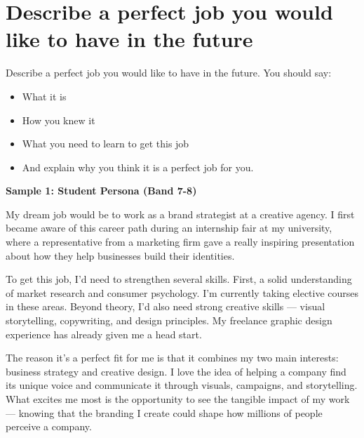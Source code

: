 \newpage

\section{Describe a perfect job you would like to have in the future}
\begin{ieltsprompt}
Describe a perfect job you would like to have in the future.
You should say:
\begin{itemize}[leftmargin=2em, itemsep=2pt]
\item What it is
\item How you knew it
\item What you need to learn to get this job
\item And explain why you think it is a perfect job for you.
\end{itemize}
\end{ieltsprompt}
\begin{ieltsanswer}
\textbf{Sample 1: Student Persona (Band 7-8)}

My dream job would be to work as a brand strategist at a creative agency. I first became aware of this career path during an internship fair at my university, where a representative from a marketing firm gave a really inspiring presentation about how they help businesses build their identities.

To get this job, I'd need to strengthen several skills. First, a solid understanding of market research and consumer psychology. I'm currently taking elective courses in these areas. Beyond theory, I'd also need strong creative skills — visual storytelling, copywriting, and design principles. My freelance graphic design experience has already given me a head start.

The reason it's a perfect fit for me is that it combines my two main interests: business strategy and creative design. I love the idea of helping a company find its unique voice and communicate it through visuals, campaigns, and storytelling. What excites me most is the opportunity to see the tangible impact of my work — knowing that the branding I create could shape how millions of people perceive a company.
\end{ieltsanswer}


